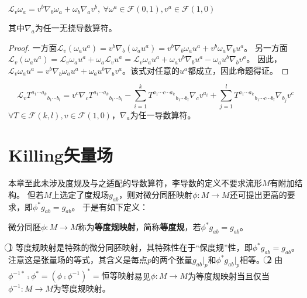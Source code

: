 \begin{theorem}
	$\mathscr{L}_v\omega_a = v^b\nabla_b\omega_a + \omega_b\nabla_av^b, ~ \forall \omega^a \in \mathscr{F}(0, 1), v^a \in \mathscr{F}(1, 0)$

	其中$\nabla_a$为任一无挠导数算符。
\end{theorem}

\begin{proof}
	一方面$\mathscr{L}_v(\omega_au^a) = v^b\nabla_b(\omega_au^a) = v^b\nabla_b\omega_au^a + v^b\omega_a\nabla_bu^a$。
	另一方面$\mathscr{L}_v(\omega_au^a) = \mathscr{L}_v\omega_au^a + \omega_a\mathscr{L}_vu^a = \mathscr{L}_v\omega_au^a + \omega_av^b\nabla_bu^a - \omega_au^b\nabla_bv^a$。
	因此，$\mathscr{L}_v\omega_au^a = v^b\nabla_b\omega_au^a + \omega_au^b\nabla_bv^a$。该式对任意的$u^a$都成立，因此命题得证。
\end{proof}

\begin{theorem}
	$$\mathscr{L}_vT^{a_1 \cdots a_k}{}_{b_1 \cdots b_l} = v^c\nabla_cT^{a_1 \cdots a_k}{}_{b_1 \cdots b_l} - \sum^k_{i = 1}T^{a_1 \cdots c \cdots a_k}{}_{b_1 \cdots b_l}\nabla_cv^{a_i} + \sum^l_{j = 1}T^{a_1 \cdots a_k}{}_{b_1 \cdots c \cdots b_l}\nabla_{b_j}v^c$$
	$\forall T \in \mathscr{F}(k, l), v \in \mathscr{F}(1, 0)$，$\nabla_a$为任一导数算符。
\end{theorem}

\section{Killing矢量场}

本章至此未涉及度规及与之适配的导数算符，李导数的定义不要求流形$M$有附加结构。
但若$M$上选定了度规场$g_{ab}$，则对微分同胚映射$\phi \colon M \to M$还可提出更高的要求，即$\phi^*g_{ab} = g_{ab}$。
于是有如下定义：

\begin{definition}
	微分同胚$\phi \colon M \to M$称为\textbf{等度规映射}，简称\textbf{等度规}，若$\phi^*g_{ab} = g_{ab}$。
\end{definition}

\begin{note}
	\textcircled{1} 等度规映射是特殊的微分同胚映射，其特殊性在于``保度规''性，即$\phi^*g_{ab} = g_{ab}$。
	注意这是张量场的等式，其含义是每点$p$的两个张量$g_{ab}|_p$和$\phi^*g_{ab}|_p$相等。
	\textcircled{2} 由$\phi^{-1*} \comp \phi^* = (\phi \comp \phi^{-1})^* = \text{恒等映射}$易见$\phi \colon M \to M$为等度规映射当且仅当$\phi^{-1} \colon M \to M$为等度规映射。
\end{note}

